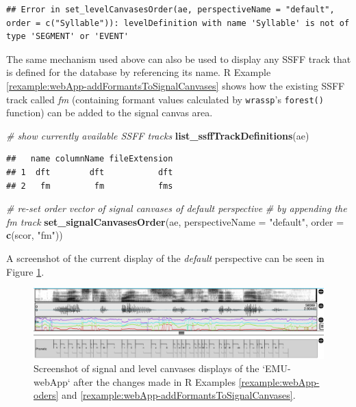 \documentclass[]{book}
\newenvironment{Shaded}{\begin{snugshade}}{\end{snugshade}}
\newcommand{\CommentTok}[1]{\textcolor[rgb]{0.56,0.35,0.01}{\textit{#1}}}
\newcommand{\DataTypeTok}[1]{\textcolor[rgb]{0.13,0.29,0.53}{#1}}
\newcommand{\KeywordTok}[1]{\textcolor[rgb]{0.13,0.29,0.53}{\textbf{#1}}}
\newcommand{\NormalTok}[1]{#1}
\newcommand{\StringTok}[1]{\textcolor[rgb]{0.31,0.60,0.02}{#1}}
\theoremstyle{definition}
\theoremstyle{definition}
\theoremstyle{definition}
\theoremstyle{remark}
\begin{document}
\begin{verbatim}
## Error in set_levelCanvasesOrder(ae, perspectiveName = "default", order = c("Syllable")): levelDefinition with name 'Syllable' is not of type 'SEGMENT' or 'EVENT'
\end{verbatim}

The same mechanism used above can also be used to display any SSFF track
that is defined for the database by referencing its name. R Example
\ref{rexample:webApp-addFormantsToSignalCanvases} shows how the existing
SSFF track called \emph{fm} (containing formant values calculated by
\texttt{wrassp}'s \texttt{forest()} function) can be added to the signal
canvas area.

\begin{Shaded}
\begin{Highlighting}[]
\CommentTok{# show currently available SSFF tracks}
\KeywordTok{list_ssffTrackDefinitions}\NormalTok{(ae)}
\end{Highlighting}
\end{Shaded}

\begin{verbatim}
##   name columnName fileExtension
## 1  dft        dft           dft
## 2   fm         fm           fms
\end{verbatim}

\begin{Shaded}
\begin{Highlighting}[]
\CommentTok{# re-set order vector of signal canvases of default perspective}
\CommentTok{# by appending the fm track}
\KeywordTok{set_signalCanvasesOrder}\NormalTok{(ae,}
                        \DataTypeTok{perspectiveName =} \StringTok{"default"}\NormalTok{,}
                        \DataTypeTok{order =} \KeywordTok{c}\NormalTok{(scor, }\StringTok{"fm"}\NormalTok{))}
\end{Highlighting}
\end{Shaded}

A screenshot of the current display of the \emph{default} perspective
can be seen in Figure \ref{fig:webApp-postOderChange}.

\begin{figure}

{\centering \includegraphics[width=1\linewidth]{pics/emu-webAppPostOderChange} 

}

\caption{Screenshot of signal and level canvases displays of the `EMU-webApp` after the changes made in R Examples \ref{rexample:webApp-oders} and \ref{rexample:webApp-addFormantsToSignalCanvases}.}\label{fig:webApp-postOderChange}
\end{figure}
\end{document}
